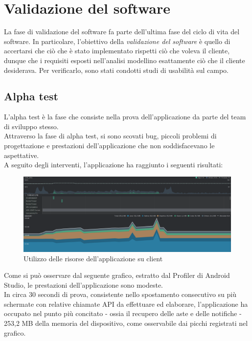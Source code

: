
\chapter{Validazione del software}
   La fase di validazione del software fa parte dell'ultima fase del ciclo di vita del software. In particolare, l'obiettivo della \textit{validazione del software} è quello di accertarsi che ciò che è stato implementato rispetti ciò che voleva il cliente, dunque che i requisiti esposti nell'analisi modellino esattamente ciò che il cliente desiderava. Per verificarlo, sono stati condotti studi di usabilità sul campo.

   \section{Alpha test}
        L'alpha test è la fase che consiste nella prova dell'applicazione da parte del team di sviluppo stesso. \\
        Attraverso la fase di alpha test, si sono scovati bug, piccoli problemi di progettazione e prestazioni dell'applicazione che non soddisfacevano le aspettative. \\
        A seguito degli interventi, l'applicazione ha raggiunto i seguenti risultati:
        \begin{figure}[htbp!]
            \centering
            \includegraphics[width=1\linewidth]{Immagini/Validazione Software/Prestazioni.png}
            \caption{Utilizzo delle risorse dell'applicazione su client}
        \end{figure}
        Come si può osservare dal seguente grafico, estratto dal Profiler di Android Studio, le prestazioni dell'applicazione sono modeste. \\
        In circa 30 secondi di prova, consistente nello spostamento consecutivo su più schermate con relative chiamate API da effettuare ed elaborare, l'applicazione ha occupato nel punto più concitato - ossia il recupero delle aste e delle notifiche - 253,2 MB della memoria del dispositivo, come osservabile dai picchi registrati nel grafico. \\
